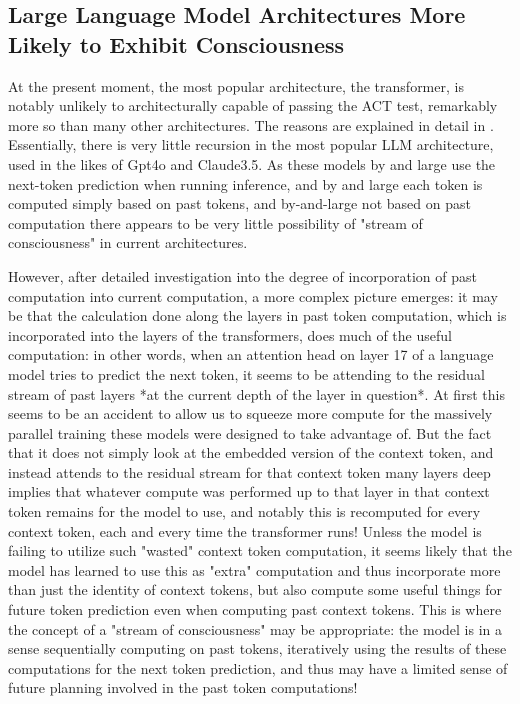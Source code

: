 \documentclass{article}
\begin{document}
\subsection{Large Language Model Architectures More Likely to Exhibit Consciousness}
At the present moment, the most popular architecture, the transformer, is notably unlikely to architecturally capable of passing the ACT test, remarkably more so than many other architectures. The reasons are explained in detail in \citep{butlin2023consciousnessartificialintelligenceinsights}. Essentially, there is very little recursion in the most popular LLM architecture, used in the likes of Gpt4o and Claude3.5. As these models by and large use the next-token prediction when running inference, and by and large each token is computed simply based on past tokens, and by-and-large not based on past computation there appears to be very little possibility of "stream of consciousness" in current architectures.

However, after detailed investigation into the degree of incorporation of past computation into current computation, a more complex picture emerges: it may be that the calculation done along the layers in past token computation, which is incorporated into the layers of the transformers, does much of the useful computation: in other words, when an attention head on layer 17 of a language model tries to predict the next token, it seems to be attending to the residual stream of past layers *at the current depth of the layer in question*. At first this seems to be an accident to allow us to squeeze more compute for the massively parallel training these models were designed to take advantage of. But the fact that it does not simply look at the embedded version of the context token, and instead attends to the residual stream for that context token many layers deep implies that whatever compute was performed up to that layer in that context token remains for the model to use, and notably this is recomputed for every context token, each and every time the transformer runs! Unless the model is failing to utilize such "wasted" context token computation, it seems likely that the model has learned to use this as "extra" computation and thus incorporate more than just the identity of context tokens, but also compute some useful things for future token prediction even when computing past context tokens. This is where the concept of a "stream of consciousness" may be appropriate: the model is in a sense sequentially computing on past tokens, iteratively using the results of these computations for the next token prediction, and thus may have a limited sense of future planning involved in the past token computations!
\end{document}
